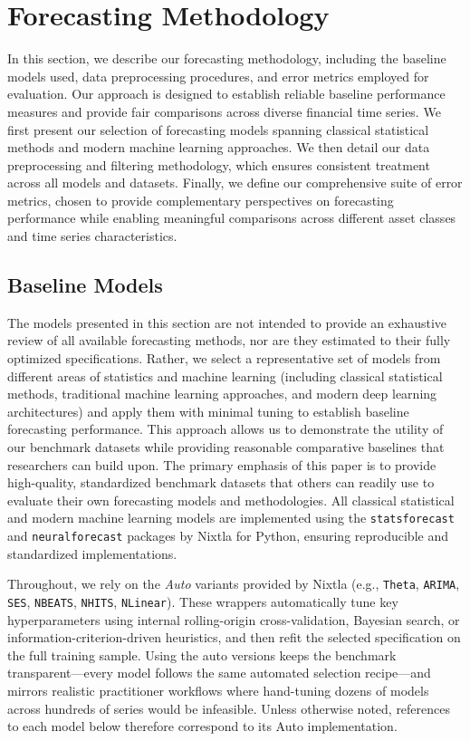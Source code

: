 \documentclass{article}
\begin{document}
\section{Forecasting Methodology}
\label{sec:methodology}

In this section, we describe our forecasting methodology, including the baseline models used, data preprocessing procedures, and error metrics employed for evaluation. Our approach is designed to establish reliable baseline performance measures and provide fair comparisons across diverse financial time series. We first present our selection of forecasting models spanning classical statistical methods and modern machine learning approaches. We then detail our data preprocessing and filtering methodology, which ensures consistent treatment across all models and datasets. Finally, we define our comprehensive suite of error metrics, chosen to provide complementary perspectives on forecasting performance while enabling meaningful comparisons across different asset classes and time series characteristics.

\subsection{Baseline Models}

The models presented in this section are not intended to provide an exhaustive review of all available forecasting methods, nor are they estimated to their fully optimized specifications. Rather, we select a representative set of models from different areas of statistics and machine learning (including classical statistical methods, traditional machine learning approaches, and modern deep learning architectures) and apply them with minimal tuning to establish baseline forecasting performance. This approach allows us to demonstrate the utility of our benchmark datasets while providing reasonable comparative baselines that researchers can build upon. The primary emphasis of this paper is to provide high-quality, standardized benchmark datasets that others can readily use to evaluate their own forecasting models and methodologies. All classical statistical and modern machine learning models are implemented using the \texttt{statsforecast} and \texttt{neuralforecast} packages by Nixtla for Python, ensuring reproducible and standardized implementations.

Throughout, we rely on the \emph{Auto} variants provided by Nixtla (e.g., \texttt{Theta}, \texttt{ARIMA}, \texttt{SES}, \texttt{NBEATS}, \texttt{NHITS}, \texttt{NLinear}). These wrappers automatically tune key hyperparameters using internal rolling-origin cross-validation, Bayesian search, or information-criterion-driven heuristics, and then refit the selected specification on the full training sample. Using the auto versions keeps the benchmark transparent—every model follows the same automated selection recipe—and mirrors realistic practitioner workflows where hand-tuning dozens of models across hundreds of series would be infeasible. Unless otherwise noted, references to each model below therefore correspond to its Auto implementation.
\end{document}
